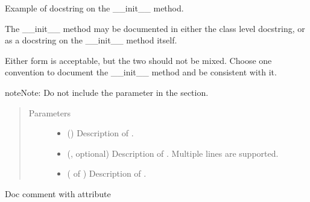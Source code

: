 \documentclass[letterpaper,10pt,english]{sphinxmanual}
\begin{document}
\begin{fulllineitems}
\begin{fulllineitems}
\begin{quote}
\begin{description}
\end{description}\end{quote}

\end{fulllineitems}


\sphinxAtStartPar
Example of docstring on the \_\_init\_\_ method.

\sphinxAtStartPar
The \_\_init\_\_ method may be documented in either the class level
docstring, or as a docstring on the \_\_init\_\_ method itself.

\sphinxAtStartPar
Either form is acceptable, but the two should not be mixed. Choose one
convention to document the \_\_init\_\_ method and be consistent with it.

\begin{sphinxadmonition}{note}{Note:}
\sphinxAtStartPar
Do not include the  parameter in the  section.
\end{sphinxadmonition}
\begin{quote}\begin{description}
\item[{Parameters}] \leavevmode\begin{itemize}
\item {} 
\sphinxAtStartPar
{} () \textendash{} Description of .

\item {} 
\sphinxAtStartPar
{} (, optional) \textendash{} Description of . Multiple
lines are supported.

\item {} 
\sphinxAtStartPar
{} ( of ) \textendash{} Description of .

\end{itemize}

\end{description}\end{quote}

\begin{fulllineitems}
\label{\detokenize{source/example:example.ExampleClass.attr3}}
\pysigstartsignatures
{}
\pysigstopsignatures
\sphinxAtStartPar
Doc comment  with attribute


\end{fulllineitems}
\end{fulllineitems}
\end{document}
